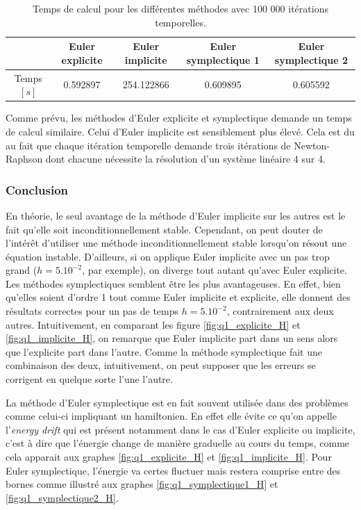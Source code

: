 \begin{table}[h]
\centering
\begin{tabular}{|c|cccc|}
\hline
 & Euler explicite & Euler implicite & Euler symplectique 1 & Euler symplectique 2 \\
\hline
Temps $[s]$ & 0.592897 & 254.122866 & 0.609895 &  0.605592\\
\hline
\end{tabular}
\caption{Temps de calcul pour les différentes méthodes avec 100 000 itérations temporelles.}
\label{table_time}
\end{table}

Comme prévu, les méthodes d'Euler explicite et symplectique demande un temps de calcul similaire. Celui d'Euler implicite est sensiblement plus élevé. Cela est du au fait que chaque itération temporelle demande trois itérations de Newton-Raphson dont chacune nécessite la résolution d'un système linéaire 4 sur 4.


\subsubsection{Conclusion} En théorie, le seul avantage de la méthode d'Euler implicite sur les autres est le fait qu'elle soit inconditionnellement stable. Cependant, on peut douter de l'intérêt d'utiliser une méthode inconditionnellement stable lorsqu'on résout une équation instable. D'ailleurs, si on applique Euler implicite avec un pas trop grand ($h=5.10^{-2}$, par exemple), on diverge tout autant qu'avec Euler explicite. \\
  Les méthodes symplectiques semblent être les plus avantageuses. En effet, bien qu'elles soient d'ordre 1 tout comme Euler implicite et explicite, elle donnent des résultats correctes pour un pas de temps $h=5.10^{-2}$, contrairement aux deux autres. Intuitivement, en comparant les figure \ref{fig:q1_explicite_H} et \ref{fig:q1_implicite_H}, on remarque que Euler implicite part dans un sens alors que l'explicite part dans l'autre. Comme la méthode symplectique fait une combinaison des deux, intuitivement, on peut supposer que les erreurs se corrigent en quelque sorte l'une l'autre.

  La méthode d'Euler symplectique est en fait souvent utilisée dans des problèmes comme celui-ci impliquant un hamiltonien. En effet elle évite ce qu'on appelle l'\textit{energy drift} qui est présent notamment dans le cas d'Euler explicite ou implicite, c'est à dire que l'énergie change de manière graduelle au cours du temps, comme cela apparait aux graphes \ref{fig:q1_explicite_H} et \ref{fig:q1_implicite_H}. Pour Euler symplectique, l'énergie va certes fluctuer mais restera comprise entre des bornes comme illustré aux graphes \ref{fig:q1_symplectique1_H} et \ref{fig:q1_symplectique2_H}.
